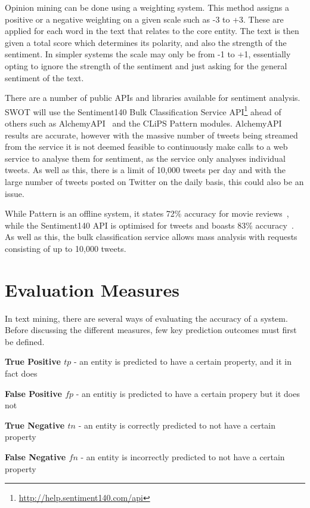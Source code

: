 Opinion mining can be done using a weighting system. This method assigns a positive or a negative weighting on a given scale such as -3 to +3. These are applied for each word in the text that relates to the core entity. The text is then given a total score which determines its polarity, and also the strength of the sentiment. In simpler systems the scale may only be from -1 to +1, essentially opting to ignore the strength of the sentiment and just asking for the general sentiment of the text.

There are a number of public APIs and libraries available for sentiment analysis. SWOT will use the Sentiment140 Bulk Classification Service API\footnote{\url{http://help.sentiment140.com/api}} ahead of others such as AlchemyAPI~\cite{alchemyapi} and the CLiPS Pattern modules. 
AlchemyAPI results are accurate, however with the massive number of tweets being streamed from the service it is not deemed feasible to continuously make calls to a web service to analyse them for sentiment, as the service only analyses individual tweets. As well as this, there is a limit of 10,000 tweets per day and with the large number of tweets posted on Twitter on the daily basis, this could also be an issue.

While Pattern is an offline system, it states 72\% accuracy for movie reviews~\cite{pattern}, while the Sentiment140 API is optimised for tweets and boasts 83\% accuracy~\cite{Go_Bhayani_Huang_2009}. As well as this, the bulk classification service allows mass analysis with requests consisting of up to 10,000 tweets.

\section{Evaluation Measures}
In text mining, there are several ways of evaluating the accuracy of a system. Before discussing the different measures, few key prediction outcomes must first be defined.

\textbf{True Positive $tp$} - an entity is predicted to have a certain property, and it in fact does

\textbf{False Positive $fp$} - an entitiy is predicted to have a certain propery but it does not

\textbf{True Negative $tn$} - an entity is correctly predicted to not have a certain property

\textbf{False Negative $fn$} - an entity is incorrectly predicted to not have a certain property

